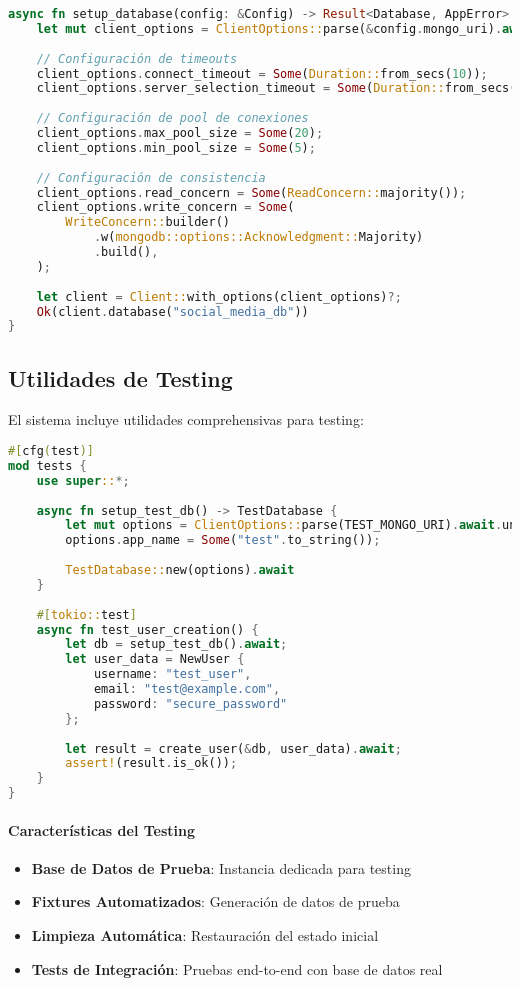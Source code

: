 \documentclass[12pt,letterpaper]{article}
\begin{document}
\begin{lstlisting}[language=rust]
async fn setup_database(config: &Config) -> Result<Database, AppError> {
    let mut client_options = ClientOptions::parse(&config.mongo_uri).await?;
    
    // Configuración de timeouts
    client_options.connect_timeout = Some(Duration::from_secs(10));
    client_options.server_selection_timeout = Some(Duration::from_secs(15));
    
    // Configuración de pool de conexiones
    client_options.max_pool_size = Some(20);
    client_options.min_pool_size = Some(5);
    
    // Configuración de consistencia
    client_options.read_concern = Some(ReadConcern::majority());
    client_options.write_concern = Some(
        WriteConcern::builder()
            .w(mongodb::options::Acknowledgment::Majority)
            .build(),
    );
    
    let client = Client::with_options(client_options)?;
    Ok(client.database("social_media_db"))
}
\end{lstlisting}

\subsection{Utilidades de Testing}
El sistema incluye utilidades comprehensivas para testing:

\begin{lstlisting}[language=rust]
#[cfg(test)]
mod tests {
    use super::*;
    
    async fn setup_test_db() -> TestDatabase {
        let mut options = ClientOptions::parse(TEST_MONGO_URI).await.unwrap();
        options.app_name = Some("test".to_string());
        
        TestDatabase::new(options).await
    }
    
    #[tokio::test]
    async fn test_user_creation() {
        let db = setup_test_db().await;
        let user_data = NewUser {
            username: "test_user",
            email: "test@example.com",
            password: "secure_password"
        };
        
        let result = create_user(&db, user_data).await;
        assert!(result.is_ok());
    }
}
\end{lstlisting}

\paragraph{Características del Testing}
\begin{itemize}
    \item \textbf{Base de Datos de Prueba}: Instancia dedicada para testing
    \item \textbf{Fixtures Automatizados}: Generación de datos de prueba
    \item \textbf{Limpieza Automática}: Restauración del estado inicial
    \item \textbf{Tests de Integración}: Pruebas end-to-end con base de datos real
\end{itemize}
\end{document}
